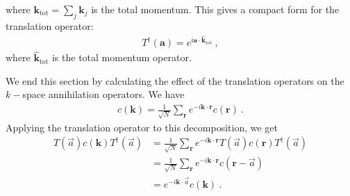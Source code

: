 where \({\bm k}_\text{tot} = \sum_j {\bm k}_j\) is the total momentum. This gives a compact form for the translation operator:
\begin{equation}\begin{aligned}
	T^\dagger({\bm a}) = e^{i {\bm a}\cdot{\bm{\hat k}}_\text{tot}}~,
\end{aligned}\end{equation}
where \(\hat {\bm k}_\text{tot}\) is the total momentum operator.

We end this section by calculating the effect of the translation operators on the \(k-\)space annihilation operators. We have
\begin{equation}\begin{aligned}\label{fourTransf}
	c({\bm k}) = \frac{1}{\sqrt N}\sum_{\bm r}e^{-i{\bm k}\cdot{\bm r}}c({\bm r})~.
\end{aligned}\end{equation}
Applying the translation operator to this decomposition, we get
\begin{equation}\begin{aligned}\label{translationOnField}
	T\left(\vec a\right) c({\bm k}) T^\dagger\left(\vec a\right) &= \frac{1}{\sqrt N}\sum_{\bm r}e^{-i{\bm k}\cdot{\bm r}}T\left(\vec a\right) c({\bm r}) T^\dagger\left(\vec a\right) \\
																 &= \frac{1}{\sqrt N}\sum_{\bm r}e^{-i{\bm k}\cdot{\bm r}}c({\bm r} - \vec a) \\
																 &= e^{-i{\bm k}\cdot\vec a}c({\bm k})~.
\end{aligned}\end{equation}

